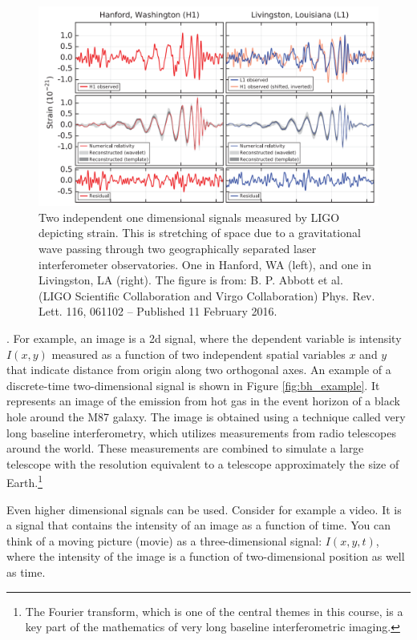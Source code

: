 \begin{figure}
\begin{center}
\includegraphics[width=\textwidth]{ch04/figures/dc_fg.png}
\end{center}
\caption{Two independent one dimensional signals measured by LIGO depicting strain. This is stretching of space due to a gravitational wave passing through two geographically separated laser interferometer observatories. One in Hanford, WA (left), and one in Livingston, LA (right). The figure is from: B. P. Abbott et al. (LIGO Scientific Collaboration and Virgo Collaboration) Phys. Rev. Lett. 116, 061102 – Published 11
February 2016.}
\label{fig:ligo_meas}
\end{figure}

. For example, an image is a 2d signal, where the dependent variable is intensity $I(x,y)$ measured as a function of two independent spatial variables $x$ and $y$ that indicate distance from origin along two orthogonal axes.  An example of a discrete-time two-dimensional signal is shown in Figure \ref{fig:bh_example}. 
It represents an image of the emission from hot gas in the event horizon of a black hole around the M87 galaxy. 
The image is obtained using a technique called very long baseline interferometry, which utilizes measurements from radio telescopes around the world. 
These measurements are combined to simulate a large telescope with the resolution equivalent to a telescope approximately the size of Earth.\footnote{The Fourier transform, which is one of the central themes in this course, is a key part of the mathematics of very long baseline interferometric imaging.}

Even higher dimensional signals can be used. Consider for example a video. It is a signal that contains the intensity of an image as a function of time. You can think of a moving picture (movie) as a three-dimensional signal: $I(x,y,t)$, where the intensity of the image is a function of two-dimensional position as well as time.

